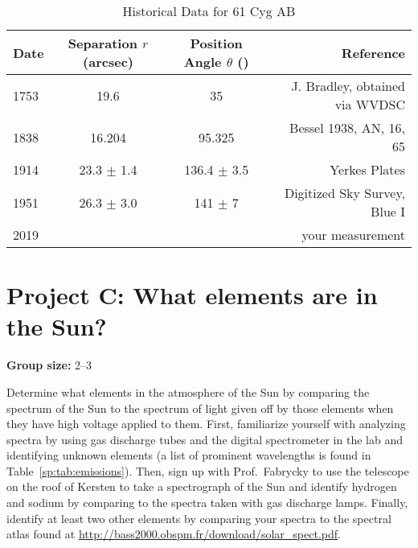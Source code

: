 \begin{table}
	\centering
	\caption{Historical Data for 61 Cyg AB}
	\label{61cyg_data}
	\begin{tabular}{|l|c|c|r|}
		\hline
		\textbf{Date} & \textbf{Separation $r$ (arcsec)} & \textbf{Position Angle $\theta$ (\textdegree)} & \textbf{Reference} \\
		\hline
		1753 & 19.6 & 35 & J. Bradley, obtained via WVDSC\\
		1838 & 16.204 & 95.325 & Bessel 1938, AN, 16, 65\\
		1914 & 23.3 $\pm$ 1.4 & 136.4 $\pm$ 3.5 & Yerkes Plates\\
		1951 & 26.3 $\pm$ 3.0 & 141 $\pm$ 7 & Digitized Sky Survey, Blue I\\
		2019 & & & your measurement\\
		\hline
	\end{tabular}
\end{table}

\section{Project C: What elements are in the Sun?}

\textbf{Group size:} 2--3

Determine what elements in the atmosphere of the Sun by comparing the spectrum of the Sun to the spectrum of light given off by those elements when they have high voltage applied to them. First, familiarize yourself with analyzing spectra by using gas discharge tubes and the digital spectrometer in the lab and identifying unknown elements (a list of prominent wavelengths is found in Table\ \ref{sp:tab:emissions}). Then, sign up with Prof.\ Fabrycky to use the telescope on the roof of Kersten to take a spectrograph of the Sun and identify hydrogen and sodium by comparing to the spectra taken with gas discharge lamps. Finally, identify at least two other elements by comparing your spectra to the spectral atlas found at \url{http://bass2000.obspm.fr/download/solar_spect.pdf}.

